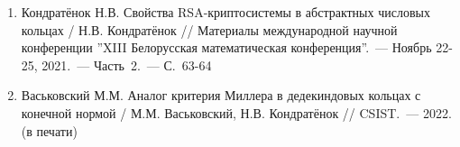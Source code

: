 \begin{enumerate}
    \item \label{source:XIII_Belarussian_math_conference_2021}
    Кондратёнок Н.В. Свойства RSA-криптосистемы в абстрактных числовых кольцах / Н.В. Кондратёнок // Материалы международной научной конференции ''XIII Белорусская математическая конференция''.~--- Ноябрь 22-25, 2021.~--- Часть~2.~--- С.~63-64

    \item \label{source:CSIST_2022}
    Васьковский М.М. Аналог критерия Миллера в дедекиндовых кольцах с конечной нормой / М.М. Васьковский, Н.В. Кондратёнок // CSIST.~--- 2022. (в печати)

\end{enumerate}

